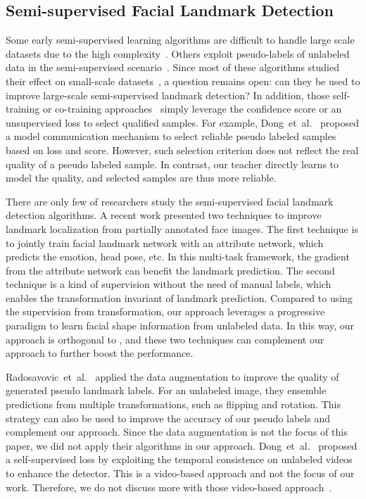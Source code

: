 \documentclass[10pt,twocolumn,letterpaper]{article}
\begin{document}
\subsection{Semi-supervised Facial Landmark Detection}\label{sec:relate-semi}

Some early semi-supervised learning algorithms are difficult to handle large scale datasets due to the high complexity~\cite{chapelle2006semi}.
Others exploit pseudo-labels of unlabeled data in the semi-supervised scenario~\cite{bachmannips2014learning,bengio2009curriculum,kumar2010self,ma2017self}.
Since most of these algorithms studied their effect on small-scale datasets~\cite{chapelle2006semi,bachmannips2014learning,kumar2010self,ma2017self}, a question remains open: can they be used to improve large-scale semi-supervised landmark detection?
In addition, those self-training or co-training approaches~\cite{kumar2010self,ma2017self,dong2018few} simply leverage the confidence score or an unsupervised loss to select qualified samples.
For example, Dong~et~al.~\cite{dong2018few} proposed a model communication mechanism to select reliable pseudo labeled samples based on loss and score.
However, such selection criterion does not reflect the real quality of a pseudo labeled sample.
In contrast, our teacher directly learns to model the quality, and selected samples are thus more reliable.

There are only few of researchers study the semi-supervised facial landmark detection algorithms.
A recent work \cite{honari2018improving} presented two techniques to improve landmark localization from partially annotated face images.
The first technique is to jointly train facial landmark network with an attribute network, which predicts the emotion, head pose, etc.
In this multi-task framework, the gradient from the attribute network can benefit the landmark prediction.
The second technique is a kind of supervision without the need of manual labels, which enables the transformation invariant of landmark prediction.
Compared to using the supervision from transformation, our approach leverages a progressive paradigm to learn facial shape information from unlabeled data.
In this way, our approach is orthogonal to \cite{honari2018improving}, and these two techniques can complement our approach to further boost the performance.

Radosavovic~et~al.~\cite{radosavovic2018data} applied the data augmentation to improve the quality of generated pseudo landmark labels.
For an unlabeled image, they ensemble predictions from multiple transformations, such as flipping and rotation. This strategy can also be used to improve the accuracy of our pseudo labels and complement our approach. Since the data augmentation is not the focus of this paper, we did not apply their algorithms in our approach.
Dong~et~al.~\cite{dong2018sbr} proposed a self-supervised loss by exploiting the temporal consistence on unlabeled videos to enhance the detector. This is a video-based approach and not the focus of our work. Therefore, we do not discuss more with those video-based approach~\cite{khan2017synergy,dong2018sbr}.
\end{document}
